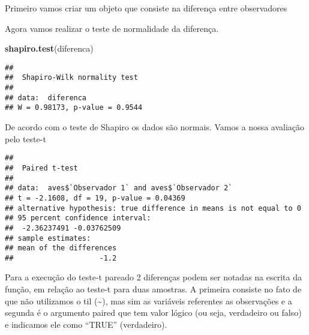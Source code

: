 \documentclass[14pt,titlepage, oneside, openany, a4paper]{book}
\newenvironment{Shaded}{\begin{snugshade}}{\end{snugshade}}
\newcommand{\DataTypeTok}[1]{\textcolor[rgb]{0.13,0.29,0.53}{#1}}
\newcommand{\FloatTok}[1]{\textcolor[rgb]{0.00,0.00,0.81}{#1}}
\newcommand{\KeywordTok}[1]{\textcolor[rgb]{0.13,0.29,0.53}{\textbf{#1}}}
\newcommand{\NormalTok}[1]{#1}
\newcommand{\OperatorTok}[1]{\textcolor[rgb]{0.81,0.36,0.00}{\textbf{#1}}}
\newcommand{\OtherTok}[1]{\textcolor[rgb]{0.56,0.35,0.01}{#1}}
\newcommand{\StringTok}[1]{\textcolor[rgb]{0.31,0.60,0.02}{#1}}
\begin{document}
Primeiro vamos criar um objeto que consiste na diferença entre observadores

\begin{Shaded}
\end{Shaded}

Agora vamos realizar o teste de normalidade da diferença.

\begin{Shaded}
\begin{Highlighting}[]
\KeywordTok{shapiro.test}\NormalTok{(diferenca)}
\end{Highlighting}
\end{Shaded}

\begin{verbatim}
## 
##  Shapiro-Wilk normality test
## 
## data:  diferenca
## W = 0.98173, p-value = 0.9544
\end{verbatim}

De acordo com o teste de Shapiro os dados são normais. Vamos a nossa avaliação pelo teste-t

\begin{Shaded}
\end{Shaded}

\begin{verbatim}
## 
##  Paired t-test
## 
## data:  aves$`Observador 1` and aves$`Observador 2`
## t = -2.1608, df = 19, p-value = 0.04369
## alternative hypothesis: true difference in means is not equal to 0
## 95 percent confidence interval:
##  -2.36237491 -0.03762509
## sample estimates:
## mean of the differences 
##                    -1.2
\end{verbatim}

Para a execução do teste-t pareado 2 diferenças podem ser notadas na escrita da função, em relação ao teste-t para duas amostras. A primeira consiste no fato de que não utilizamos o til (\textasciitilde{}), mas sim as variáveis referentes as observações e a segunda é o argumento paired que tem valor lógico (ou seja, verdadeiro ou falso) e indicamos ele como ``TRUE'' (verdadeiro).
\end{document}
